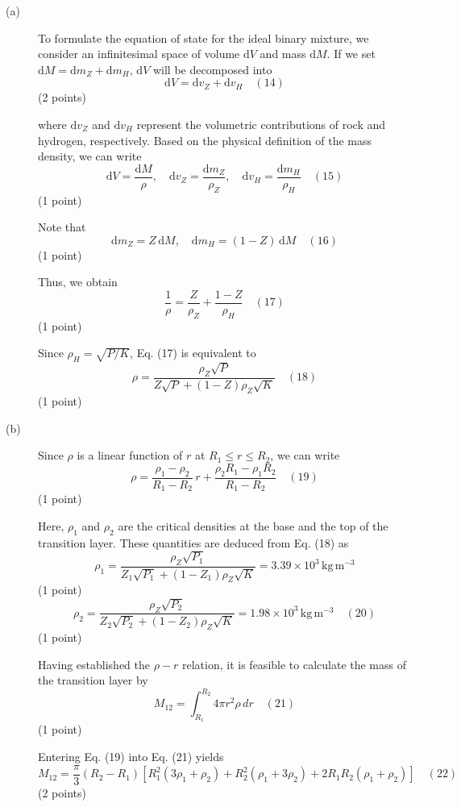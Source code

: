 \begin{description}
\item[(a)] To formulate the equation of state for the ideal binary mixture, we
  consider an infinitesimal space of volume $\mathrm{d}V$ and mass
  $\mathrm{d}M$. If we set $\mathrm{d}M = \mathrm{d}m_Z + \mathrm{d}m_H$,
  $\mathrm{d}V$ will be decomposed into
  \[ \mathrm{d}V = \mathrm{d}v_Z + \mathrm{d}v_H \quad (14) \]
  \hfill(2 points)

  where $\mathrm{d}v_Z$ and $\mathrm{d}v_H$ represent the volumetric
  contributions of rock and hydrogen, respectively. Based on the physical
  definition of the mass density, we can write
  \[ \mathrm{d}V = \frac{\mathrm{d}M}{\rho}, \quad
     \mathrm{d}v_Z = \frac{\mathrm{d}m_Z}{\rho_Z}, \quad
     \mathrm{d}v_H = \frac{\mathrm{d}m_H}{\rho_H} \quad (15) \]
  \hfill(1 point)

  Note that
  \[ \mathrm{d}m_Z = Z\,\mathrm{d}M, \quad
     \mathrm{d}m_H = (1 - Z)\,\mathrm{d}M \quad (16) \]
  \hfill(1 point)

  Thus, we obtain
  \[ \frac{1}{\rho} = \frac{Z}{\rho_Z} + \frac{1 - Z}{\rho_H} \quad (17) \]
  \hfill(1 point)

  Since $\rho_H = \sqrt{P/K}$, Eq. (17) is equivalent to
  \[ \rho = \frac{\rho_Z\sqrt{P}}{Z\sqrt{P} + (1 - Z)\rho_Z\sqrt{K}}
     \quad (18) \]
  \hfill(1 point)

\item[(b)] Since $\rho$ is a linear function of $r$ at $R_1 \le r \le R_2$, we
  can write
  \[ \rho = \frac{\rho_1 - \rho_2}{R_1 - R_2}\,r
     + \frac{\rho_2 R_1 - \rho_1 R_2}{R_1 - R_2} \quad (19) \]
  \hfill(1 point)

  Here, $\rho_1$ and $\rho_2$ are the critical densities at the base and the
  top of the transition layer. These quantities are deduced from Eq. (18) as
  \[ \rho_1 = \frac{\rho_Z\sqrt{P_1}}{Z_1\sqrt{P_1} + (1 - Z_1)\rho_Z\sqrt{K}}
     = 3.39 \times 10^{3}\,\mathrm{kg\,m^{-3}} \]
  \hfill(1 point)
  \[ \rho_2 = \frac{\rho_Z\sqrt{P_2}}{Z_2\sqrt{P_2} + (1 - Z_2)\rho_Z\sqrt{K}}
     = 1.98 \times 10^{3}\,\mathrm{kg\,m^{-3}} \quad (20) \]
  \hfill(1 point)

  Having established the $\rho - r$ relation, it is feasible to calculate the
  mass of the transition layer by
  \[ M_{12} = \int_{R_1}^{R_2} 4\pi r^2 \rho\,dr \quad (21) \]
  \hfill(1 point)

  Entering Eq. (19) into Eq. (21) yields
  \[ M_{12} = \frac{\pi}{3}(R_2 - R_1)\left[R_1^2(3\rho_1 + \rho_2)
     + R_2^2(\rho_1 + 3\rho_2) + 2R_1 R_2(\rho_1 + \rho_2)\right]
     \quad (22) \]
  \hfill(2 points)


\end{description}
